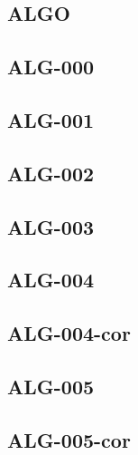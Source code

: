 \begin{multicols}{2}
\section*{ALGO}

\newcommand{\xxexo}{ALG-000}
\subsection*{\xxexo}
\graphicspath{{../../exos/algo/\xxexo/}}


\renewcommand{\xxexo}{ALG-001}
\subsection*{\xxexo}
\graphicspath{{../../exos/algo/\xxexo/}}


\renewcommand{\xxexo}{ALG-002}
\subsection*{\xxexo}
\graphicspath{{../../exos/algo/\xxexo/}}


\renewcommand{\xxexo}{ALG-003}
\subsection*{\xxexo}
\graphicspath{{../../exos/algo/\xxexo/}}


\renewcommand{\xxexo}{ALG-004}
\subsection*{\xxexo}
\graphicspath{{../../exos/algo/\xxexo/}}



\renewcommand{\xxexo}{ALG-004-cor}
\subsection*{\xxexo}


\renewcommand{\xxexo}{ALG-005}
\subsection*{\xxexo}
\graphicspath{{../../exos/algo/\xxexo/}}


\renewcommand{\xxexo}{ALG-005-cor}
\subsection*{\xxexo}
\graphicspath{{../../exos/algo/\xxexo/}}



\end{multicols}
